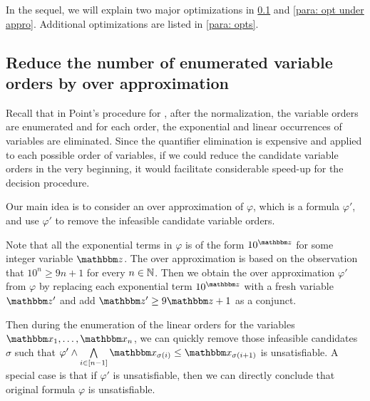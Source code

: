In the sequel, we will explain two major optimizations in \ref{para: opt reduce} and \ref{para: opt under appro}. Additional optimizations are listed in \ref{para: opts}.

\subsection{Reduce the number of enumerated variable orders by over approximation}\label{para: opt reduce}

Recall that in Point's procedure for {\paexp}, after the normalization, the variable orders are enumerated and for each order, the exponential and linear occurrences of variables are eliminated. Since the quantifier elimination is expensive and applied to each possible order of variables, if we could reduce the candidate variable orders in the very beginning, it would facilitate considerable speed-up for the decision procedure. 

Our main idea is to consider an over approximation of $\varphi$, which is a {\pa} formula $\varphi'$, and use $\varphi'$ to remove the infeasible candidate variable orders.

Note that all the exponential terms in $\varphi$ is of the form $10^{\ivarz}$ for some integer variable $\ivarz$. 
%
The over approximation is based on the observation that $10^n \ge 9 n + 1$ for every $n \in \mathbb{N}$. Then we obtain the over approximation $\varphi'$ from $\varphi$ by replacing each exponential term $10^{\ivarz}$ with a fresh variable $\ivarz'$ and add $\ivarz' \ge 9 \ivarz +1$ as a conjunct.

Then during the enumeration of the linear orders for the variables $\ivarx_1, \ldots, \ivarx_n$, we can quickly remove those infeasible candidates $\sigma$ such that $\varphi' \wedge \bigwedge \limits_{i \in [n-1]}\ivarx_{\sigma(i)} \le \ivarx_{\sigma(i+1)}$ is unsatisfiable. A special case is that if $\varphi'$ is unsatisfiable, then we can directly conclude that original formula $\varphi$ is unsatisfiable.



